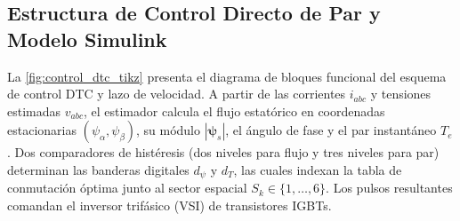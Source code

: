 \documentclass[conference]{IEEEtran}
\begin{document}
\subsection{Estructura de Control Directo de Par y Modelo Simulink}
La \autoref{fig:control_dtc_tikz} presenta el diagrama de bloques funcional del esquema de control DTC y lazo de velocidad. A partir de las corrientes $i_{abc}$ y tensiones estimadas $v_{abc}$, el estimador calcula el flujo estatórico en coordenadas estacionarias $(\psi_\alpha, \psi_\beta)$, su módulo $|\boldsymbol{\psi}_s|$, el ángulo de fase y el par instantáneo $T_e$. Dos comparadores de histéresis (dos niveles para flujo y tres niveles para par) determinan las banderas digitales $d_\psi$ y $d_T$, las cuales indexan la tabla de conmutación óptima junto al sector espacial $S_k \in \{1, \dots, 6\}$. Los pulsos resultantes comandan el inversor trifásico (VSI) de transistores IGBTs.
\end{document}
